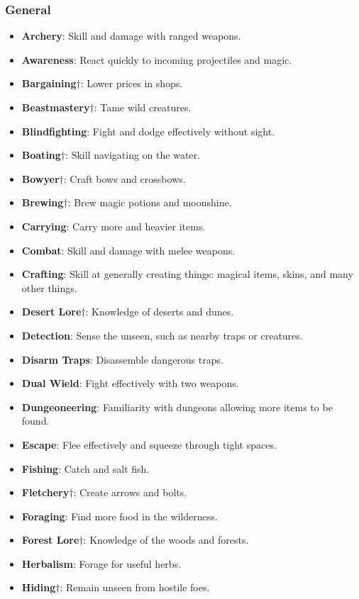 \subsubsection{General}
\begin{itemize}
\item {\bf Archery}: Skill and damage with ranged weapons.
\item {\bf Awareness}: React quickly to incoming projectiles and magic.
\item {\bf Bargaining}$\dagger$: Lower prices in shops.
\item {\bf Beastmastery}$\dagger$: Tame wild creatures.
\item {\bf Blindfighting}: Fight and dodge effectively without sight. 
\item {\bf Boating}$\dagger$: Skill navigating on the water.
\item {\bf Bowyer}$\dagger$: Craft bows and crossbows.
\item {\bf Brewing}$\dagger$: Brew magic potions and moonshine. 
\item {\bf Carrying}: Carry more and heavier items.
\item {\bf Combat}: Skill and damage with melee weapons. 
\item {\bf Crafting}: Skill at generally creating things: magical items, skins, and many other things.
\item {\bf Desert Lore}$\dagger$: Knowledge of deserts and dunes. 
\item {\bf Detection}: Sense the unseen, such as nearby traps or creatures.
\item {\bf Disarm Traps}: Disassemble dangerous traps. 
\item {\bf Dual Wield}: Fight effectively with two weapons. 
\item {\bf Dungeoneering}: Familiarity with dungeons allowing more items to be found.
\item {\bf Escape}: Flee effectively and squeeze through tight spaces.
\item {\bf Fishing}: Catch and salt fish.
\item {\bf Fletchery}$\dagger$: Create arrows and bolts. 
\item {\bf Foraging}: Find more food in the wilderness.
\item {\bf Forest Lore}$\dagger$: Knowledge of the woods and forests. 
\item {\bf Herbalism}: Forage for useful herbs. 
\item {\bf Hiding}$\dagger$: Remain unseen from hostile foes.

\end{itemize}
